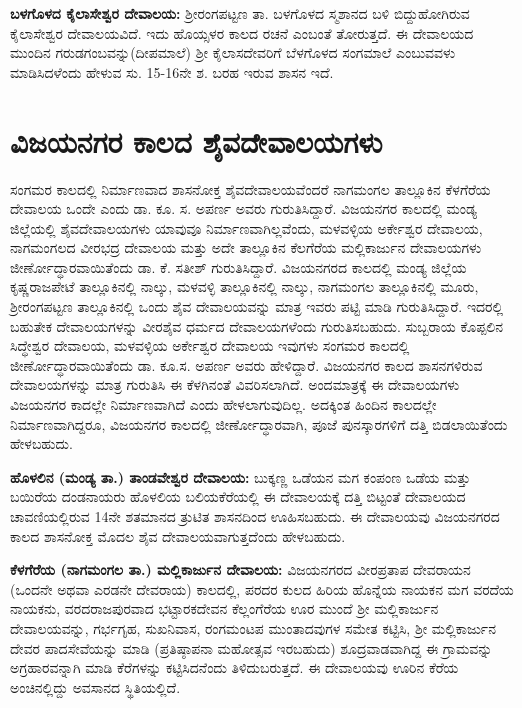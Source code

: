 \textbf{ಬಳಗೊಳದ ಕೈಲಾಸೇಶ್ವರ ದೇವಾಲಯ:} ಶ‍್ರೀರಂಗಪಟ್ಟಣ ತಾ. ಬಳಗೊಳದ ಸ್ಮಶಾನದ ಬಳಿ ಬಿದ್ದುಹೋಗಿರುವ ಕೈಲಾಸೇಶ್ವರ ದೇವಾಲಯ\-ವಿದೆ. ಇದು ಹೊಯ್ಸಳರ ಕಾಲದ ರಚನೆ ಎಂಬಂತೆ ತೋರುತ್ತದೆ. ಈ ದೇವಾಲಯದ ಮುಂದಿನ ಗರುಡಗಂಬವನ್ನು(ದೀಪಮಾಲೆ) ಶ‍್ರೀ ಕೈಲಾಸದೇವರಿಗೆ ಬೆಳಗೊಳದ ಸಂಗಮಾಲೆ ಎಂಬುವವಳು ಮಾಡಿಸಿದಳೆಂದು ಹೇಳುವ ಸು. 15-16ನೇ ಶ. ಬರಹ ಇರುವ ಶಾಸನ ಇದೆ. 


\section*{ವಿಜಯನಗರ ಕಾಲದ ಶೈವದೇವಾಲಯಗಳು}

\vskip -5pt

ಸಂಗಮರ ಕಾಲದಲ್ಲಿ ನಿರ್ಮಾಣವಾದ ಶಾಸನೋಕ್ತ ಶೈವದೇವಾಲಯವೆಂದರೆ ನಾಗಮಂಗಲ ತಾಲ್ಲೂಕಿನ ಕೆಳಗೆರೆಯ ದೇವಾಲಯ ಒಂದೇ ಎಂದು ಡಾ. ಕೂ. ಸ. ಅಪರ್ಣ ಅವರು ಗುರುತಿಸಿದ್ದಾರೆ. ವಿಜಯನಗರ ಕಾಲದಲ್ಲಿ ಮಂಡ್ಯ ಜಿಲ್ಲೆಯಲ್ಲಿ ಶೈವದೇವಾಲಯಗಳು ಯಾವುವೂ ನಿರ್ಮಾಣವಾಗಿಲ್ಲವೆಂದು, ಮಳವಳ್ಳಿಯ ಅರ್ಕೇಶ್ವರ ದೇವಾಲಯ, ನಾಗಮಂಗಲದ ವೀರಭದ್ರ ದೇವಾಲಯ ಮತ್ತು ಅದೇ ತಾಲ್ಲೂಕಿನ ಕೆಲಗೆರೆಯ ಮಲ್ಲಿಕಾರ್ಜುನ ದೇವಾಲಯಗಳು ಜೀರ್ಣೋದ್ಧಾರವಾಯಿತೆಂದು ಡಾ. ಕೆ. ಸತೀಶ್​ ಗುರುತಿಸಿದ್ದಾರೆ. ವಿಜಯನಗರದ ಕಾಲದಲ್ಲಿ ಮಂಡ್ಯ ಜಿಲ್ಲೆಯ ಕೃಷ್ಣರಾಜಪೇಟೆ ತಾಲ್ಲೂಕಿನಲ್ಲಿ ನಾಲ್ಕು, ಮಳವಳ್ಳಿ ತಾಲ್ಲೂಕಿನಲ್ಲಿ ನಾಲ್ಕು, ನಾಗಮಂಗಲ ತಾಲ್ಲೂಕಿನಲ್ಲಿ ಮೂರು, ಶ‍್ರೀರಂಗಪಟ್ಟಣ ತಾಲ್ಲೂಕಿನಲ್ಲಿ ಒಂದು ಶೈವ ದೇವಾಲಯವನ್ನು ಮಾತ್ರ ಇವರು ಪಟ್ಟಿ ಮಾಡಿ ಗುರುತಿಸಿದ್ದಾರೆ. ಇದರಲ್ಲಿ ಬಹುತೇಕ ದೇವಾಲಯಗಳನ್ನು ವೀರಶೈವ ಧರ್ಮದ ದೇವಾಲಯಗಳೆಂದು ಗುರುತಿಸಬಹುದು. ಸುಬ್ಬರಾಯ ಕೊಪ್ಪಲಿನ ಸಿದ್ಧೇಶ್ವರ ದೇವಾಲಯ, ಮಳವಳ್ಳಿಯ ಅರ್ಕೇಶ್ವರ ದೇವಾಲಯ ಇವುಗಳು ಸಂಗಮರ ಕಾಲದಲ್ಲಿ ಜೀರ್ಣೋದ್ಧಾರವಾಯಿತೆಂದು ಡಾ. ಕೂ.ಸ. ಅಪರ್ಣ ಅವರು ಹೇಳಿದ್ದಾರೆ. ವಿಜಯನಗರ ಕಾಲದ ಶಾಸನಗಳಿರುವ ದೇವಾಲಯಗಳನ್ನು ಮಾತ್ರ ಗುರುತಿಸಿ ಈ ಕೆಳಗಿನಂತೆ ವಿವರಿಸಲಾಗಿದೆ. ಅಂದಮಾತ್ರಕ್ಕೆ ಈ ದೇವಾಲಯಗಳು ವಿಜಯನಗರ ಕಾದಲ್ಲೇ ನಿರ್ಮಾಣವಾಗಿದೆ ಎಂದು ಹೇಳಲಾಗುವುದಿಲ್ಲ. ಅದಕ್ಕಿಂತ ಹಿಂದಿನ ಕಾಲದಲ್ಲೇ ನಿರ್ಮಾಣವಾಗಿದ್ದರೂ, ವಿಜಯನಗರ ಕಾಲದಲ್ಲಿ ಜೀರ್ಣೋದ್ಧಾರವಾಗಿ, ಪೂಜೆ ಪುನಸ್ಕಾರಗಳಿಗೆ ದತ್ತಿ ಬಿಡಲಾಯಿತೆಂದು ಹೇಳಬಹುದು.

\textbf{ಹೊಳಲಿನ (ಮಂಡ್ಯ ತಾ.) ತಾಂಡವೇಶ್ವರ ದೇವಾಲಯ: } ಬುಕ್ಕಣ್ಣ ಒಡೆಯನ ಮಗ ಕಂಪಂಣ ಒಡೆಯ ಮತ್ತು ಬಯಿರೆಯ ದಂಡನಾಯರು ಹೊಳಲಿಯ ಬಲಿಯಕೆರೆಯಲ್ಲಿ ಈ ದೇವಾಲಯಕ್ಕೆ ದತ್ತಿ ಬಿಟ್ಟಂತೆ ದೇವಾಲಯದ ಚಾವಣಿಯಲ್ಲಿರುವ 14ನೇ ಶತಮಾನದ ತ್ರುಟಿತ ಶಾಸನದಿಂದ ಊಹಿಸಬಹುದು. ಈ ದೇವಾಲಯವು ವಿಜಯನಗರದ ಕಾಲದ ಶಾಸನೋಕ್ತ ಮೊದಲ ಶೈವ ದೇವಾಲಯವಾಗುತ್ತದೆಂದು ಹೇಳಬಹುದು.

\textbf{ಕೆಳಗೆರೆಯ (ನಾಗಮಂಗಲ ತಾ.) ಮಲ್ಲಿಕಾರ್ಜುನ ದೇವಾಲಯ: } ವಿಜಯನಗರದ ವೀರಪ್ರತಾಪ ದೇವರಾಯನ (ಒಂದನೇ ಅಥವಾ ಎರಡನೇ ದೇವರಾಯ) ಕಾಲದಲ್ಲಿ, ಪರದರ ಕುಲದ ಹಿರಿಯ ಹೊನ್ನೆಯ ನಾಯಕನ ಮಗ ವರದೆಯ ನಾಯಕನು, ವರದರಾಜಪುರವಾದ ಭಟ್ಟಾರಕದೇವನ ಕೆಲ್ಲಂಗೆರೆಯ ಊರ ಮುಂದೆ ಶ‍್ರೀ ಮಲ್ಲಿಕಾರ್ಜುನ ದೇವಾಲಯವನ್ನು, ಗರ್ಭಗೃಹ, ಸುಖನಿವಾಸ, ರಂಗಮಂಟಪ ಮುಂತಾದವುಗಳ ಸಮೇತ ಕಟ್ಟಿಸಿ, ಶ‍್ರೀ ಮಲ್ಲಿಕಾರ್ಜುನ ದೇವರ ಪಾದಸೇವೆಯನ್ನು ಮಾಡಿ (ಪ್ರತಿಷ್ಠಾಪನಾ ಮಹೋತ್ಸವ ಇರಬಹುದು) ಶೂದ್ರವಾಡವಾಗಿದ್ದ ಈ ಗ್ರಾಮವನ್ನು ಅಗ್ರಹಾರವನ್ನಾಗಿ ಮಾಡಿ ಕೆರೆಗಳನ್ನು ಕಟ್ಟಿಸಿದನೆಂದು ತಿಳಿದುಬರುತ್ತದೆ. ಈ ದೇವಾಲಯವು ಊರಿನ ಕೆರೆಯ ಅಂಚಿನಲ್ಲಿದ್ದು ಅವಸಾನದ ಸ್ಥಿತಿಯಲ್ಲಿದೆ.

